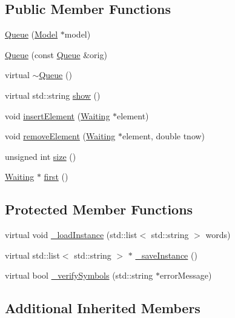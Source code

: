 \subsection*{Public Member Functions}
\begin{DoxyCompactItemize}
\item 
\hyperlink{class_queue_a67994e94c7d825b421a188c6b76f4014}{Queue} (\hyperlink{class_model}{Model} $\ast$model)
\item 
\hyperlink{class_queue_a09f908d6edb810d86871bda50fdf4bac}{Queue} (const \hyperlink{class_queue}{Queue} \&orig)
\item 
virtual \hyperlink{class_queue_a00d119db8fa3050da37746e82cbcf94f}{$\sim$\+Queue} ()
\item 
virtual std\+::string \hyperlink{class_queue_ac78cc84cd91539c7f38d95dc17dabac5}{show} ()
\item 
void \hyperlink{class_queue_a961b5b7ca80317aa69f958612fb988ad}{insert\+Element} (\hyperlink{class_waiting}{Waiting} $\ast$element)
\item 
void \hyperlink{class_queue_a114d5144b3026b57cca9cf481b1f0d65}{remove\+Element} (\hyperlink{class_waiting}{Waiting} $\ast$element, double tnow)
\item 
unsigned int \hyperlink{class_queue_a4cd92f99b7abc9ec4df32690dc5a037d}{size} ()
\item 
\hyperlink{class_waiting}{Waiting} $\ast$ \hyperlink{class_queue_a39a1f5a1733f61634339ecee7aac7907}{first} ()
\end{DoxyCompactItemize}
\subsection*{Protected Member Functions}
\begin{DoxyCompactItemize}
\item 
virtual void \hyperlink{class_queue_ac722922c7cac47ed74502c2d7206c074}{\+\_\+load\+Instance} (std\+::list$<$ std\+::string $>$ words)
\item 
virtual std\+::list$<$ std\+::string $>$ $\ast$ \hyperlink{class_queue_a9245790264a9d68030ae8bd884c85bcf}{\+\_\+save\+Instance} ()
\item 
virtual bool \hyperlink{class_queue_a81f6676597a7974af394ddd3f67c7926}{\+\_\+verify\+Symbols} (std\+::string $\ast$error\+Message)
\end{DoxyCompactItemize}
\subsection*{Additional Inherited Members}


